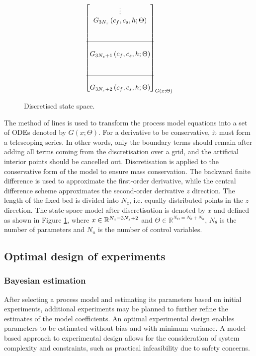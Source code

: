\documentclass[a4paper,fleqn]{cas-dc}
\begin{document}
\begin{figure}[!h]
{\begin{align*}
{\begin{bmatrix}
							\vdots\\
							G_{3N_z} \left( c_f,c_s,h; \Theta \right) \\ 
							\\ \\ \hline \\
							G_{3N_z+1} \left( c_f,c_s,h; \Theta \right) \\
							\\ \\ \hline \\
							G_{3N_z+2} \left( c_f,c_s,h; \Theta \right) 
					\end{bmatrix}}_{G \left( x; \Theta \right)} 
			\end{align*} }
			\caption{Discretised state space.}
			\label{fig:discretization}
		\end{figure}
		
		The method of lines is used to transform the process model equations into a set of ODEs denoted by $G(x;\Theta)$. For a derivative to be conservative, it must form a telescoping series. In other words, only the boundary terms should remain after adding all terms coming from the discretisation over a grid, and the artificial interior points should be cancelled out. Discretisation is applied to the conservative form of the model to ensure mass conservation. The backward finite difference is used to approximate the first-order derivative, while the central difference scheme approximates the second-order derivative $z$ direction. The length of the fixed bed is divided into $N_z$, i.e. equally distributed points in the $z$ direction. The state-space model after discretisation is denoted by $x$ and defined as shown in Figure \ref{fig:discretization}, where ${\color{black}x} \in \mathbb{R}^{N_x = 3N_z+2} $ and $\Theta \in \mathbb{R}^{N_\Theta =  N_{\theta} + N_u } $, $N_{\theta}$ is the number of parameters and $N_{u}$ is the number of control variables.
		
		\subsection{Optimal design of experiments} \label{CH: DOE}
		\subsubsection{Bayesian estimation}
		
		After selecting a process model and estimating its parameters based on initial experiments, additional experiments may be planned to further refine the estimates of the model coefficients. An optimal experimental design enables parameters to be estimated without bias and with minimum variance. A model-based approach to experimental design allows for the consideration of system complexity and constraints, such as practical infeasibility due to safety concerns.
		
\end{document}
